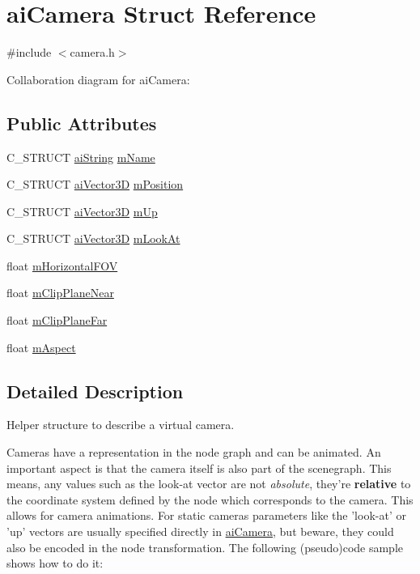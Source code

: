 \hypertarget{structai_camera}{\section{ai\-Camera Struct Reference}
\label{structai_camera}
}


{\ttfamily \#include $<$camera.\-h$>$}



Collaboration diagram for ai\-Camera\-:
\subsection*{Public Attributes}
\begin{DoxyCompactItemize}
\item 
C\-\_\-\-S\-T\-R\-U\-C\-T \hyperlink{structai_string}{ai\-String} \hyperlink{structai_camera_aa6a5fe5e04b3db1b23f69eb9910c6816}{m\-Name}
\item 
C\-\_\-\-S\-T\-R\-U\-C\-T \hyperlink{structai_vector3_d}{ai\-Vector3\-D} \hyperlink{structai_camera_a518617ea192ca0698e748a4399e7c3a5}{m\-Position}
\item 
C\-\_\-\-S\-T\-R\-U\-C\-T \hyperlink{structai_vector3_d}{ai\-Vector3\-D} \hyperlink{structai_camera_a7fb42b287389b4f99c883098268d6d1a}{m\-Up}
\item 
C\-\_\-\-S\-T\-R\-U\-C\-T \hyperlink{structai_vector3_d}{ai\-Vector3\-D} \hyperlink{structai_camera_af9463249ac870e030fa435b1186cef23}{m\-Look\-At}
\item 
float \hyperlink{structai_camera_adcdea73ece19ea0a9068f5544ec23592}{m\-Horizontal\-F\-O\-V}
\item 
float \hyperlink{structai_camera_a720e8c94c036dcefe4b13cc1c69c521e}{m\-Clip\-Plane\-Near}
\item 
float \hyperlink{structai_camera_aa9ccf77e3d7ca3dc8f46df931b65172f}{m\-Clip\-Plane\-Far}
\item 
float \hyperlink{structai_camera_ae414556eaa6f910b5927f465d97bf70c}{m\-Aspect}
\end{DoxyCompactItemize}


\subsection{Detailed Description}
Helper structure to describe a virtual camera.

Cameras have a representation in the node graph and can be animated. An important aspect is that the camera itself is also part of the scenegraph. This means, any values such as the look-\/at vector are not {\itshape absolute}, they're {\bfseries relative} to the coordinate system defined by the node which corresponds to the camera. This allows for camera animations. For static cameras parameters like the 'look-\/at' or 'up' vectors are usually specified directly in \hyperlink{structai_camera}{ai\-Camera}, but beware, they could also be encoded in the node transformation. The following (pseudo)code sample shows how to do it\-: \par
\par
 
